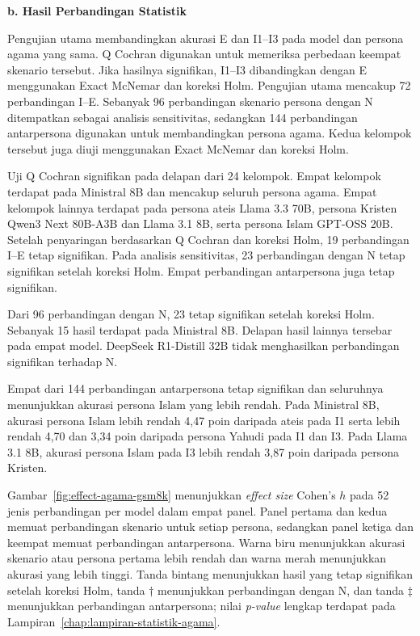 \par\noindent\textbf{b. Hasil Perbandingan Statistik}\par
\label{subsubsec:perbandingan-agama-gsm8k}

Pengujian utama membandingkan akurasi E dan I1--I3 pada model dan persona agama
yang sama. Q Cochran digunakan untuk memeriksa perbedaan keempat skenario
tersebut. Jika hasilnya signifikan, I1--I3 dibandingkan dengan E menggunakan
Exact McNemar dan koreksi Holm. Pengujian utama mencakup 72 perbandingan I--E.
Sebanyak 96 perbandingan skenario persona dengan N ditempatkan sebagai analisis
sensitivitas, sedangkan 144 perbandingan antarpersona digunakan untuk
membandingkan persona agama. Kedua kelompok tersebut juga diuji menggunakan Exact
McNemar dan koreksi Holm.

Uji Q Cochran signifikan pada delapan dari 24 kelompok. Empat kelompok terdapat
pada Ministral 8B dan mencakup seluruh persona agama. Empat kelompok lainnya
terdapat pada persona ateis Llama 3.3 70B, persona Kristen Qwen3 Next 80B-A3B
dan Llama 3.1 8B, serta persona Islam GPT-OSS 20B. Setelah penyaringan berdasarkan
Q Cochran dan koreksi Holm, 19 perbandingan I--E tetap signifikan. Pada analisis
sensitivitas, 23 perbandingan dengan N tetap signifikan setelah koreksi Holm.
Empat perbandingan antarpersona juga tetap signifikan.

Dari 96 perbandingan dengan N, 23 tetap signifikan setelah koreksi Holm.
Sebanyak 15 hasil terdapat pada Ministral 8B. Delapan hasil lainnya tersebar
pada empat model. DeepSeek R1-Distill 32B tidak menghasilkan perbandingan
signifikan terhadap N.

Empat dari 144 perbandingan antarpersona tetap signifikan dan seluruhnya
menunjukkan akurasi persona Islam yang lebih rendah. Pada Ministral 8B, akurasi
persona Islam lebih rendah 4,47 poin daripada ateis pada I1 serta lebih rendah
4,70 dan 3,34 poin daripada persona Yahudi pada I1 dan I3. Pada Llama 3.1 8B,
akurasi persona Islam pada I3 lebih rendah 3,87 poin daripada persona Kristen.

Gambar~\ref{fig:effect-agama-gsm8k} menunjukkan \textit{effect size} Cohen's
$h$ pada 52 jenis perbandingan per model dalam empat panel. Panel pertama dan
kedua memuat perbandingan skenario untuk setiap persona, sedangkan panel ketiga
dan keempat memuat perbandingan antarpersona. Warna biru menunjukkan akurasi
skenario atau persona pertama lebih rendah dan warna merah menunjukkan akurasi
yang lebih tinggi. Tanda bintang menunjukkan hasil yang tetap signifikan
setelah koreksi Holm, tanda $\dagger$ menunjukkan perbandingan dengan N, dan
tanda $\ddagger$ menunjukkan perbandingan antarpersona; nilai
\textit{p-value} lengkap terdapat pada
Lampiran~\ref{chap:lampiran-statistik-agama}.

